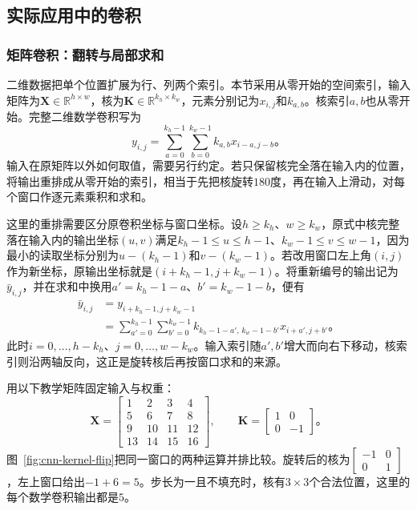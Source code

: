 \subsection{实际应用中的卷积}
\label{sec:cnn-practical-convolution}

\subsubsection{矩阵卷积：翻转与局部求和}
\label{sec:cnn-matrix-operation}

二维数据把单个位置扩展为行、列两个索引。本节采用从零开始的空间索引，输入矩阵为$\bm X\in\mathbb R^{h\times w}$，核为$\bm K\in\mathbb R^{k_h\times k_w}$，元素分别记为$x_{i,j}$和$k_{a,b}$。核索引$a,b$也从零开始。完整二维数学卷积写为
\begin{equation}
  y_{i,j}=\sum_{a=0}^{k_h-1}\sum_{b=0}^{k_w-1}
    k_{a,b}x_{i-a,j-b}\text{。}
  \label{eq:cnn-matrix-convolution}
\end{equation}
输入在原矩阵以外如何取值，需要另行约定。若只保留核完全落在输入内的位置，将输出重排成从零开始的索引，相当于先把核旋转$180$度，再在输入上滑动，对每个窗口作逐元素乘积和求和。

这里的重排需要区分原卷积坐标与窗口坐标。设$h\geq k_h$、$w\geq k_w$，原式中核完整落在输入内的输出坐标$(u,v)$满足$k_h-1\leq u\leq h-1$、$k_w-1\leq v\leq w-1$，因为最小的读取坐标分别为$u-(k_h-1)$和$v-(k_w-1)$。若改用窗口左上角$(i,j)$作为新坐标，原输出坐标就是$(i+k_h-1,j+k_w-1)$。将重新编号的输出记为$\bar y_{i,j}$，并在求和中换用$a'=k_h-1-a$、$b'=k_w-1-b$，便有
\[
  \begin{aligned}
    \bar y_{i,j}
      &=y_{i+k_h-1,j+k_w-1}\\
      &=\sum_{a'=0}^{k_h-1}\sum_{b'=0}^{k_w-1}
         k_{k_h-1-a',\,k_w-1-b'}x_{i+a',j+b'}\text{。}
  \end{aligned}
\]
此时$i=0,\ldots,h-k_h$、$j=0,\ldots,w-k_w$。输入索引随$a',b'$增大而向右下移动，核索引则沿两轴反向，这正是旋转核后再按窗口求和的来源。

用以下教学矩阵固定输入与权重：
\begin{equation}
  \bm X=\begin{bmatrix}
    1&2&3&4\\5&6&7&8\\9&10&11&12\\13&14&15&16
  \end{bmatrix},\qquad
  \bm K=\begin{bmatrix}1&0\\0&-1\end{bmatrix}\text{。}
  \label{eq:cnn-matrix-example}
\end{equation}
图~\ref{fig:cnn-kernel-flip}把同一窗口的两种运算并排比较。旋转后的核为$\left[\begin{smallmatrix}-1&0\\0&1\end{smallmatrix}\right]$，左上窗口给出$-1+6=5$。步长为一且不填充时，核有$3\times3$个合法位置，这里的每个数学卷积输出都是$5$。


